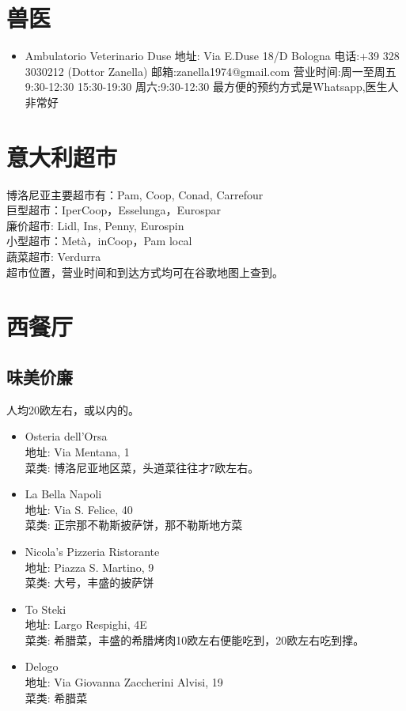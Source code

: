 \section{兽医}
\begin{itemize}
\item Ambulatorio Veterinario Duse
地址: Via E.Duse 18/D Bologna  电话:+39 328 3030212 (Dottor Zanella)
邮箱:zanella1974@gmail.com
营业时间:周一至周五9:30-12:30  15:30-19:30  周六:9:30-12:30
最方便的预约方式是Whatsapp,医生人非常好
\end{itemize}

\section{意大利超市}
\noindent 博洛尼亚主要超市有：Pam, Coop, Conad, Carrefour\\
巨型超市：IperCoop，Esselunga，Eurospar\\
廉价超市: Lidl, Ins, Penny, Eurospin\\
小型超市：Metà，inCoop，Pam local\\
蔬菜超市: Verdurra\\
超市位置，营业时间和到达方式均可在谷歌地图上查到。

\section{西餐厅}

\subsection{味美价廉}
人均20欧左右，或以内的。

\begin{itemize}
\item Osteria dell'Orsa\\
地址: Via Mentana, 1\\
菜类: 博洛尼亚地区菜，头道菜往往才7欧左右。

\item La Bella Napoli\\
地址: Via S. Felice, 40\\
菜类: 正宗那不勒斯披萨饼，那不勒斯地方菜

\item Nicola's Pizzeria Ristorante\\
地址: Piazza S. Martino, 9\\
菜类: 大号，丰盛的披萨饼

\item To Steki\\
地址: Largo Respighi, 4E\\
菜类: 希腊菜，丰盛的希腊烤肉10欧左右便能吃到，20欧左右吃到撑。

\item Delogo\\
地址: Via Giovanna Zaccherini Alvisi, 19\\
菜类: 希腊菜

\end{itemize}

